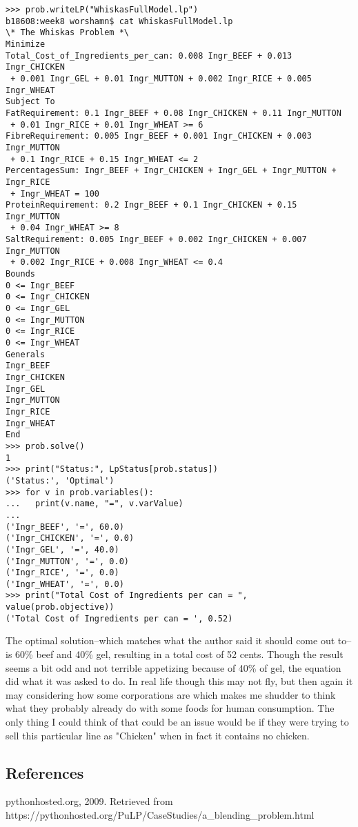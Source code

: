 \documentclass[10pt]{article}
\begin{document}
\begin{verbatim}
>>> prob.writeLP("WhiskasFullModel.lp")
b18608:week8 worshamn$ cat WhiskasFullModel.lp 
\* The Whiskas Problem *\
Minimize
Total_Cost_of_Ingredients_per_can: 0.008 Ingr_BEEF + 0.013 Ingr_CHICKEN
 + 0.001 Ingr_GEL + 0.01 Ingr_MUTTON + 0.002 Ingr_RICE + 0.005 Ingr_WHEAT
Subject To
FatRequirement: 0.1 Ingr_BEEF + 0.08 Ingr_CHICKEN + 0.11 Ingr_MUTTON
 + 0.01 Ingr_RICE + 0.01 Ingr_WHEAT >= 6
FibreRequirement: 0.005 Ingr_BEEF + 0.001 Ingr_CHICKEN + 0.003 Ingr_MUTTON
 + 0.1 Ingr_RICE + 0.15 Ingr_WHEAT <= 2
PercentagesSum: Ingr_BEEF + Ingr_CHICKEN + Ingr_GEL + Ingr_MUTTON + Ingr_RICE
 + Ingr_WHEAT = 100
ProteinRequirement: 0.2 Ingr_BEEF + 0.1 Ingr_CHICKEN + 0.15 Ingr_MUTTON
 + 0.04 Ingr_WHEAT >= 8
SaltRequirement: 0.005 Ingr_BEEF + 0.002 Ingr_CHICKEN + 0.007 Ingr_MUTTON
 + 0.002 Ingr_RICE + 0.008 Ingr_WHEAT <= 0.4
Bounds
0 <= Ingr_BEEF
0 <= Ingr_CHICKEN
0 <= Ingr_GEL
0 <= Ingr_MUTTON
0 <= Ingr_RICE
0 <= Ingr_WHEAT
Generals
Ingr_BEEF
Ingr_CHICKEN
Ingr_GEL
Ingr_MUTTON
Ingr_RICE
Ingr_WHEAT
End
>>> prob.solve()
1
>>> print("Status:", LpStatus[prob.status])
('Status:', 'Optimal')
>>> for v in prob.variables():
...   print(v.name, "=", v.varValue)
... 
('Ingr_BEEF', '=', 60.0)
('Ingr_CHICKEN', '=', 0.0)
('Ingr_GEL', '=', 40.0)
('Ingr_MUTTON', '=', 0.0)
('Ingr_RICE', '=', 0.0)
('Ingr_WHEAT', '=', 0.0)
>>> print("Total Cost of Ingredients per can = ", value(prob.objective))
('Total Cost of Ingredients per can = ', 0.52)
\end{verbatim}
The optimal solution--which matches what the author said it should come out to--is 60\% beef and 40\% gel, resulting in a total cost of 52 cents. Though the result seems a bit odd and not terrible appetizing because of 40\% of gel, the equation did what it was asked to do. In real life though this may not fly, but then again it may considering how some corporations are which makes me shudder to think what they probably already do with some foods for human consumption. The only thing I could think of that could be an issue would be if they were trying to sell this particular line as "Chicken" when in fact it contains no chicken. 
\subsection*{References}
pythonhosted.org, 2009. Retrieved from https://pythonhosted.org/PuLP/CaseStudies/a\_blending\_problem.html
\end{document}
